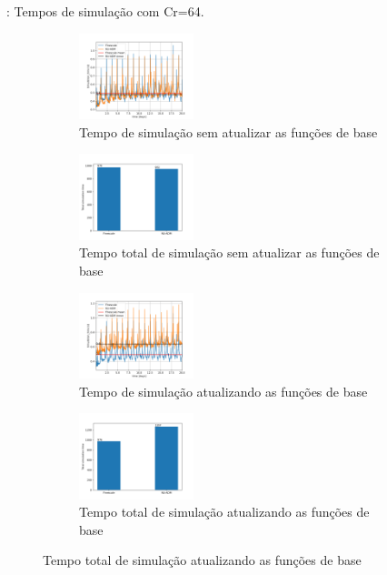 \documentclass[professionalfont]{beamer}
\begin{document}
\begin{frame}{\FrameProblemName: {\small Tempos de simulação com Cr=64.}}
    \begin{figure}[!h]
        \centering
        \begin{subfigure}{.48\textwidth}
            \centering
            \includegraphics[height=2.5cm]{./imgs/pr3/cr64/no_update/svgtopng/tempo_simulacao.png}
            \caption{Tempo de simulação sem atualizar as funções de base}
        \end{subfigure}
        \hfill
        \begin{subfigure}{.48\textwidth}
            \centering
            \includegraphics[height=2.5cm]{./imgs/pr3/cr64/no_update/svgtopng/tempo_total.png}
            \caption{Tempo total de simulação sem atualizar as funções de base}
        \end{subfigure}
        \bigskip
        \begin{subfigure}{.48\textwidth}
            \centering
            \includegraphics[height=2.5cm]{./imgs/pr3/cr64/update/svgtopng/tempo_simulacao.png}
            \caption{Tempo de simulação atualizando as funções de base}
        \end{subfigure}
        \hfill
        \begin{subfigure}{.48\textwidth}
            \centering
            \includegraphics[height=2.5cm]{./imgs/pr3/cr64/update/svgtopng/tempo_total.png}
            \caption{Tempo total de simulação atualizando as funções de base}
        \end{subfigure}
        \label{fig:fig3_pr3-cr64}
    \end{figure}
    
\end{frame}
\end{document}
